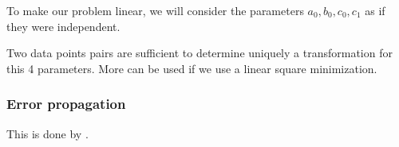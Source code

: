 To make our problem linear, we will consider the parameters $a_0, b_0, c_0, c_1$ as if they were independent.

Two data points pairs are sufficient to determine uniquely a transformation for this 4 parameters. 
More can be used if we use a linear square minimization.


\subsubsection{Error propagation}

This is done by \citet{1995PASP..107.1119V}.
